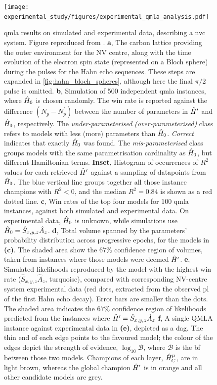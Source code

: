 \begin{figure}
    \texttt{[image: experimental\_study/figures/experimental\_qmla\_analysis.pdf]}
    \caption[QMLA applied to experimental nitrogen-vacancy centre system]{
        \gls{qmla} results on simulated and experimental data, describing a \acrfull{nvc} system.
        Figure reproduced from \cite{gentile2020learning}. 
        \textbf{a}, 
        The carbon lattice providing the outer environment for the NV centre, along with the
        time evolution of the electron spin state (represented on a Bloch sphere) during the pulses for the Hahn echo sequences. 
        These steps are expanded in \cref{fig:hahn_bloch_spheres}, although here the final $\pi/2$ pulse is omitted.  
        \textbf{b}, 
        Simulation of 500 independent \gls{qmla} instances, where $\hat{H}_0$ is chosen randomly. 
        The  \gls{win rate}  is reported against the difference $(N_{p}-N^{\prime}_p)$ between the 
        number of parameters in $\hat{H}^{\prime}$ and $\hat{H}_0$, respectively. 
        The \emph{under-parameterised} \emph{ (over-parameterised)} class refers to models with less (more) 
        parameters than $\hat{H}_0$. 
        \emph{Correct} indicates that exactly $\hat{H}_0$ was found. 
        The \emph{mis-parameterised} class groups models with the same parametrisation cardinality as $\hat{H}_0$, but different Hamiltonian terms. 
        \textbf{Inset}, Histogram of occurrences of $R^2$ values for each retrieved $\hat{H}^{\prime}$ 
        against a sampling of datapoints from $\hat{H}_0$.
        The blue vertical line groups together all those instance champions with $R^2<0$, and the median $R^2=0.84$ is shown as a red dotted line.
        \textbf{c}, 
        Win rates of the top four models for 100 \gls{qmla} instances, against both simulated and experimental data. 
        On experimental data, $\hat{H}_0$ is unknown, while simulations use $\hat{H}_0 = \hat{S}_{x,y,z}\hat{A}_{z}$.
        \textbf{d}, 
        Total \gls{volume} spanned by the parameters' probability distribution across progressive epochs, for the models in \textbf{(c)}. 
        The shaded area show the $67\%$ confidence region of volumes, taken from instances where those models were deemed $\hat{H}^{\prime}$.
        \textbf{e}, 
        Simulated \glspl{likelihood}  reproduced by the model with the highest  \gls{win rate}  ($\hat{S}_{x,y,z}\hat{A}_{z}$, turquoise), 
            compared with corresponding NV-centre system experimental data 
            (red dots, extracted from the observed \acrlong{pl} of the first Hahn echo decay). 
        Error bars are smaller than the dots.
        The shaded area indicates the $67\%$ confidence region of likelihoods predicted from the instances where $\hat{H}^{\prime}=\hat{S}_{x,y,z}\hat{A}_{z}$
        \textbf{f}, 
        A single QMLA \gls{instance} against experimental data in \textbf{(e)}, depicted as a \acrlong{dag}.
        The thin end of each edge points to the favoured model; 
        the colour of the edges depict the strength of evidence, $\log_{10}\mathcal{B}$, where $\mathcal{B}$ is the \gls{bf} between those two models.
        Champions of each layer, $\hat{H}_{C}^{\mu}$, are in light brown, whereas the global champion $\hat{H}^{\prime}$
        is in orange and all other candidate models are grey.
    }
    \label{fig:exp_qmla_analysis}
\end{figure}
